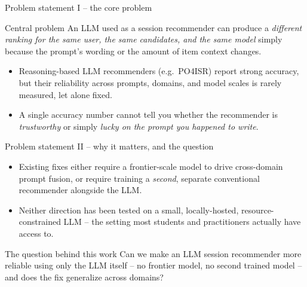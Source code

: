 \documentclass[aspectratio=169,12pt]{beamer}
\begin{document}
\begin{frame}{Problem statement I -- the core problem}
\begin{alertblock}{Central problem}
An LLM used as a session recommender can produce a \emph{different ranking
for the same user, the same candidates, and the same model} simply because
the prompt's wording or the amount of item context changes.
\end{alertblock}

\vspace{0.6em}
\begin{itemize}
  \item Reasoning-based LLM recommenders (e.g.\ PO4ISR) report strong
        accuracy, but their reliability across prompts, domains, and model
        scales is rarely measured, let alone fixed.
  \item A single accuracy number cannot tell you whether the recommender is
        \emph{trustworthy} or simply \emph{lucky on the prompt you happened
        to write}.
\end{itemize}
\end{frame}

\begin{frame}{Problem statement II -- why it matters, and the question}
\begin{itemize}
  \item Existing fixes either require a frontier-scale model to drive
        cross-domain prompt fusion, or require training a \emph{second},
        separate conventional recommender alongside the LLM.
  \item Neither direction has been tested on a small, locally-hosted,
        resource-constrained LLM -- the setting most students and
        practitioners actually have access to.
\end{itemize}

\vspace{0.8em}
\begin{block}{The question behind this work}
Can we make an LLM session recommender more reliable using only the LLM
itself -- no frontier model, no second trained model -- and does the fix
generalize across domains?
\end{block}
\end{frame}
\end{document}
